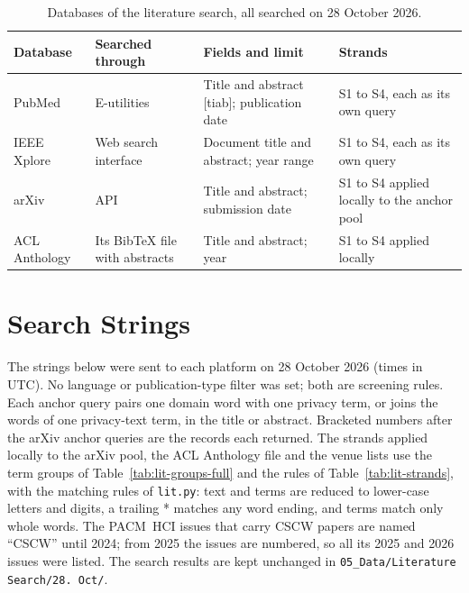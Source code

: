 \begin{table}[H]
\centering
\begin{singlespace}
\caption[Databases of the literature search]{Databases of the literature
search, all searched on 28 October 2026.}
\label{tab:lit-databases}
\small
\begin{tabularx}{\textwidth}{@{}>{\raggedright\arraybackslash}p{2.3cm}>{\raggedright\arraybackslash}p{3.0cm}>{\raggedright\arraybackslash}p{3.7cm}>{\raggedright\arraybackslash}X@{}}
\toprule
\textbf{Database} & \textbf{Searched through} & \textbf{Fields and limit} & \textbf{Strands} \\
\midrule
PubMed & E-utilities & Title and abstract [tiab]; publication date & S1 to S4, each as its own query \\
IEEE Xplore & Web search interface & Document title and abstract; year range & S1 to S4, each as its own query \\
arXiv & API & Title and abstract; submission date & S1 to S4 applied locally to the anchor pool \\
ACL Anthology & Its BibTeX file with abstracts & Title and abstract; year & S1 to S4 applied locally \\
\bottomrule
\end{tabularx}
\end{singlespace}
\end{table}

\section{Search Strings}
\label{app:lit-strings}
The strings below were sent to each platform on 28 October 2026 (times in
UTC). No language or publication-type filter was set; both are screening rules.
Each anchor query pairs one domain word with one privacy term, or joins the words
of one privacy-text term, in the title or abstract. Bracketed numbers after the
arXiv anchor queries are the records each returned. The strands applied locally to the arXiv pool, the ACL Anthology file
and the venue lists use the term groups of Table~\ref{tab:lit-groups-full} and the
rules of Table~\ref{tab:lit-strands}, with the matching rules of
\texttt{lit.py}: text and terms are reduced to lower-case letters and digits, a
trailing * matches any word ending, and terms match only whole words. The PACM~HCI issues that carry CSCW papers are named
\enquote{CSCW} until 2024; from 2025 the issues are numbered, so all its 2025
and 2026 issues were listed. The search results are kept unchanged in
\texttt{05\_Data/Literature Search/28. Oct/}.

